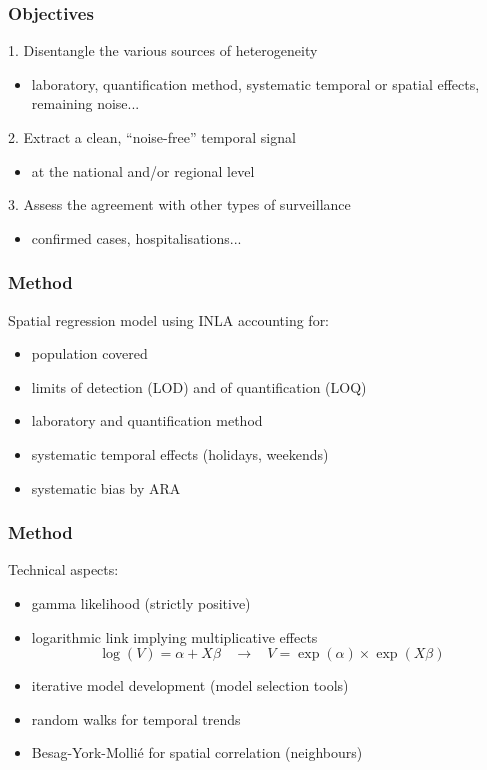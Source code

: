 \documentclass[10pt]{beamer}
\begin{document}
	\begin{frame}
		\frametitle{Objectives}
		1. Disentangle the \alert{various sources of heterogeneity}
		\begin{itemize}
			\item laboratory, quantification method, systematic temporal or spatial effects, remaining noise...
		\end{itemize}
		\pause\bigskip
		
		2. Extract a clean, ``noise-free'' \alert{temporal signal}
		\begin{itemize}
			\item at the national and/or regional level
		\end{itemize}
		\pause\bigskip
		
		3. Assess the \alert{agreement} with other types of surveillance 
		\begin{itemize}
			\item confirmed cases, hospitalisations...
		\end{itemize}
	\end{frame}
	
	\begin{frame}
		\frametitle{Method}
		\alert{Spatial regression} model using INLA accounting for:
		\begin{itemize}
			\item population covered \pause
			\item limits of detection (LOD) and of quantification (LOQ) \pause
			\item \alert{laboratory} and quantification method \pause
			\item systematic temporal effects (holidays, weekends) \pause
			\item \alert{systematic bias} by ARA 
			
		\end{itemize}
	\end{frame}
	
	
	\begin{frame}
		\frametitle{Method}
		Technical aspects:
		\begin{itemize}
			\item gamma likelihood (strictly positive)  \pause
			\item logarithmic link implying \alert{multiplicative effects} 
			$$ \log(V) = \alpha + X\beta \ \ \ \ \rightarrow \ \ \ \ V = \exp(\alpha) \times  \exp(X\beta)$$
			
			 \pause
			\item iterative model development (model selection tools) \pause
			\item \alert{random walks} for temporal trends \pause
			\item \alert{Besag-York-Mollié} for spatial correlation (neighbours)
			
		\end{itemize}
	\end{frame}
	
\end{document}

